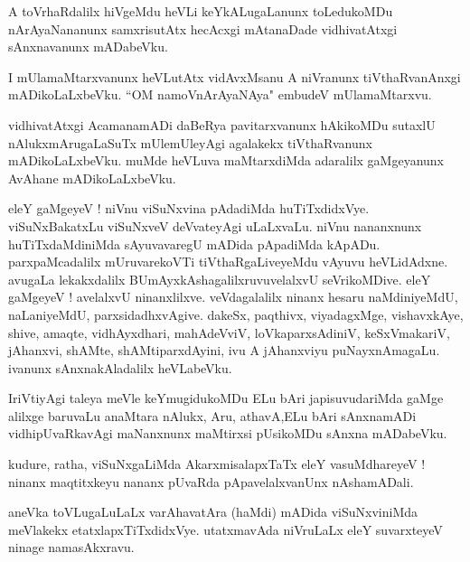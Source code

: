 \documentclass{article}
\begin{document}
\begin{mn}%
 A toVrhaRdalilx hiVgeMdu heVLi keYkALugaLanunx toLedukoMDu nArAyaNananunx samxrisutAtx 
 hecAcxgi mAtanaDade vidhivatAtxgi sAnxnavanunx mADabeVku.
\end{mn}

\begin{mn}%
I mUlamaMtarxvanunx heVLutAtx vidAvxMsanu A niVranunx  tiVthaRvanAnxgi mADikoLaLxbeVku. ``OM 
namoVnArAyaNAya" embudeV mUlamaMtarxvu.
\end{mn}

\begin{mn}%
vidhivatAtxgi AcamanamADi daBeRya pavitarxvanunx hAkikoMDu sutaxlU nAlukxmArugaLaSuTx 
mUlemUleyAgi agalakekx tiVthaRvanunx mADikoLaLxbeVku. muMde heVLuva maMtarxdiMda 
adaralilx gaMgeyanunx AvAhane mADikoLaLxbeVku.
\end{mn}

\begin{mn}%
eleY gaMgeyeV ! niVnu viSuNxvina pAdadiMda huTiTxdidxVye. viSuNxBakatxLu viSuNxveV 
deVvateyAgi uLaLxvaLu. niVnu nananxnunx huTiTxdaMdiniMda sAyuvavaregU mADida pApadiMda 
kApADu. parxpaMcadalilx mUruvarekoVTi tiVthaRgaLiveyeMdu vAyuvu heVLidAdxne. avugaLa 
lekakxdalilx BUmAyxkAshagalilxruvuvelalxvU seVrikoMDive. eleY gaMgeyeV ! avelalxvU 
ninanxlilxve. veVdagalalilx ninanx hesaru naMdiniyeMdU, naLaniyeMdU, parxsidadhxvAgive. 
dakeSx, paqthivx, viyadagxMge, vishavxkAye, shive, amaqte, vidhAyxdhari, mahAdeVviV, 
loVkaparxsAdiniV, keSxVmakariV, jAhanxvi, shAMte, shAMtiparxdAyini, ivu A jAhanxviyu 
puNayxnAmagaLu. ivanunx sAnxnakAladalilx heVLabeVku.
\end{mn}

\begin{mn}%
IriVtiyAgi taleya meVle keYmugidukoMDu ELu bAri japisuvudariMda gaMge alilxge baruvaLu 
anaMtara nAlukx, Aru, athavA,ELu bAri sAnxnamADi vidhipUvaRkavAgi maNanxnunx maMtirxsi 
pUsikoMDu sAnxna mADabeVku.
\end{mn}

\begin{mn}%
kudure, ratha, viSuNxgaLiMda AkarxmisalapxTaTx eleY vasuMdhareyeV ! ninanx maqtitxkeyu 
nananx pUvaRda pApavelalxvanUnx nAshamADali.
\end{mn}

\begin{mn}%
aneVka toVLugaLuLaLx varAhavatAra (haMdi) mADida viSuNxviniMda meVlakekx 
etatxlapxTiTxdidxVye. utatxmavAda niVruLaLx eleY suvarxteyeV ninage namasAkxravu.
\end{mn}
\end{document}
